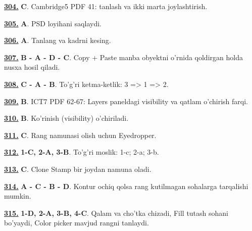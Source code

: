 \documentclass[10pt,a4paper,oneside]{article}
\begin{document}
\noindent\hyperlink{q304}{\textbf{304.}} \textbf{C}.  Cambridge5 PDF 41: tanlash va ikki marta joylashtirish.
\par\vspace{3mm}
\noindent\hyperlink{q305}{\textbf{305.}} \textbf{A}.  PSD loyihani saqlaydi.
\par\vspace{3mm}
\noindent\hyperlink{q306}{\textbf{306.}} \textbf{A}.  Tanlang va kadrni kesing.
\par\vspace{3mm}
\noindent\hyperlink{q307}{\textbf{307.}} \textbf{B - A - D - C}.  Copy + Paste manba obyektni o'rnida qoldirgan holda nusxa hosil qiladi.
\par\vspace{3mm}
\noindent\hyperlink{q308}{\textbf{308.}} \textbf{C - A - B}.  To'g'ri ketma-ketlik: 3 =\textgreater{} 1 =\textgreater{} 2.
\par\vspace{3mm}
\noindent\hyperlink{q309}{\textbf{309.}} \textbf{B}.  ICT7 PDF 62-67: Layers paneldagi visibility va qatlam o'chirish farqi.
\par\vspace{3mm}
\noindent\hyperlink{q310}{\textbf{310.}} \textbf{B}.  Ko'rinish (visibility) o'chiriladi.
\par\vspace{3mm}
\noindent\hyperlink{q311}{\textbf{311.}} \textbf{C}.  Rang namunasi olish uchun Eyedropper.
\par\vspace{3mm}
\noindent\hyperlink{q312}{\textbf{312.}} \textbf{1-C, 2-A, 3-B}.  To'g'ri moslik: 1-c; 2-a; 3-b.
\par\vspace{3mm}
\noindent\hyperlink{q313}{\textbf{313.}} \textbf{C}.  Clone Stamp bir joydan namuna oladi.
\par\vspace{3mm}
\noindent\hyperlink{q314}{\textbf{314.}} \textbf{A - C - B - D}.  Kontur ochiq qolsa rang kutilmagan sohalarga tarqalishi mumkin.
\par\vspace{3mm}
\noindent\hyperlink{q315}{\textbf{315.}} \textbf{1-D, 2-A, 3-B, 4-C}.  Qalam va cho'tka chizadi, Fill tutash sohani bo'yaydi, Color picker mavjud rangni tanlaydi.
\end{document}
